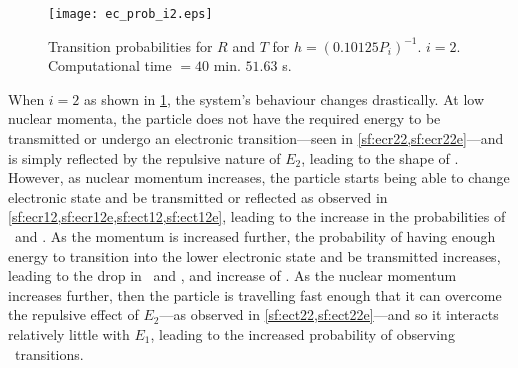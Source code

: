 \begin{figure}
\centering
\texttt{[image: ec\_prob\_i2.eps]}
\caption[Extended coupling. $ i = 2 $]{Transition probabilities for $ R $ and $ T $ for $ h = (0.10125 P_{i})^{-1} $. $ i = 2 $. Computational time $ = 40$ min. $ 51.63 $ s.}
\label{f:ec2}
\end{figure}
When $ i = 2 $ as shown in \cref{f:ec2}, the system's behaviour changes drastically. At low nuclear momenta, the particle does not have the required energy to be transmitted or undergo an electronic transition---seen in \cref{sf:ecr22,sf:ecr22e}---and is simply reflected by the repulsive nature of $ E_{2} $, leading to the shape of \rtt. However, as nuclear momentum increases, the particle starts being able to change electronic state and be transmitted or reflected as observed in \cref{sf:ecr12,sf:ecr12e,sf:ect12,sf:ect12e}, leading to the increase in the probabilities of \rot~and \tot. As the momentum is increased further, the probability of having enough energy to transition into the lower electronic state and be transmitted increases, leading to the drop in \rtt~and \rot, and increase of \tot. As the nuclear momentum increases further, then the particle is travelling fast enough that it can overcome the repulsive effect of $ E_{2} $---as observed in \cref{sf:ect22,sf:ect22e}---and so it interacts relatively little with $ E_{1} $, leading to the increased probability of observing \ttt~transitions.

